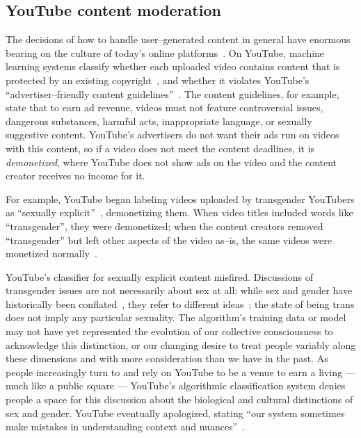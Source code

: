 \documentclass[main]{subfiles}
\begin{document}
\subsection{YouTube content moderation}\label{sec:YouTube}

The decisions of how to handle user--generated content in general have enormous bearing on
the culture of today's online platforms~\cite{gillespie2018custodians}.
On YouTube, machine learning systems classify whether each uploaded video contains
content that is protected by an existing copyright~\cite{kim2007youtube},
and whether it violates YouTube's ``advertiser--friendly content guidelines''~\cite{youtube2010youtube}.
The content guidelines, for example, state that to earn ad revenue,
videos must not feature controversial issues, dangerous substances,
harmful acts, inappropriate language, or sexually suggestive content.
YouTube's advertisers do not want their ads run on videos with this content,
so if a video does not meet the content deadlines, it is \textit{demonetized},
where YouTube does not show ads on the video and the content creator receives no income for it.

For example, YouTube began labeling videos uploaded by transgender YouTubers
as ``sexually explicit''~\cite{LGBTYouTube}, demonetizing them.
When video titles included words like ``transgender'', they were demonetized;
when the content creators removed ``transgender'' but left other aspects of the video as--is,
the same videos were monetized normally~\cite{YouTubeProblems}.


YouTube's classifier for sexually explicit content misfired.
Discussions of transgender issues are not necessarily about sex at all;
while sex and gender have historically been conflated~\cite{valdes1994queers},
they refer to different ideas~\cite{udry1994nature};
the state of being trans does not imply any particular sexuality.
The algorithm's training data or model may not have yet represented
the evolution of our collective consciousness to acknowledge this distinction,
or our changing desire to treat people variably along these dimensions
and with more consideration than we have in the past.
As people increasingly turn to and rely on YouTube to be a venue to earn a living
--- much like a public square ---
YouTube's algorithmic classification system
denies people a space for this discussion about the biological and cultural distinctions of sex and gender.
YouTube eventually apologized, stating
``our system sometimes make mistakes in understanding context and nuances''~\cite{wright_2018}.
\end{document}
